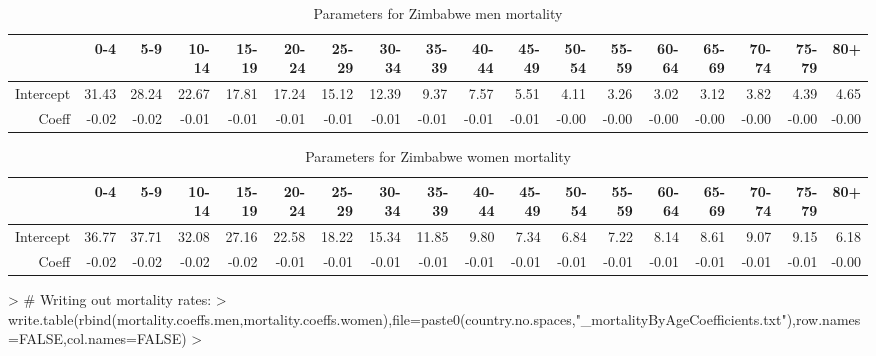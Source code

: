 \documentclass{article}
\begin{document}
\begin{landscape}
\begin{table}[ht]
\centering
\begin{tabular}{rrrrrrrrrrrrrrrrrr}
  \hline
 & 0-4 & 5-9 & 10-14 & 15-19 & 20-24 & 25-29 & 30-34 & 35-39 & 40-44 & 45-49 & 50-54 & 55-59 & 60-64 & 65-69 & 70-74 & 75-79 & 80+ \\ 
  \hline
Intercept & 31.43 & 28.24 & 22.67 & 17.81 & 17.24 & 15.12 & 12.39 & 9.37 & 7.57 & 5.51 & 4.11 & 3.26 & 3.02 & 3.12 & 3.82 & 4.39 & 4.65 \\ 
  Coeff & -0.02 & -0.02 & -0.01 & -0.01 & -0.01 & -0.01 & -0.01 & -0.01 & -0.01 & -0.01 & -0.00 & -0.00 & -0.00 & -0.00 & -0.00 & -0.00 & -0.00 \\ 
   \hline
\end{tabular}
\caption{Parameters for Zimbabwe men mortality} 
\end{table}%
\begin{table}[ht]
\centering
\begin{tabular}{rrrrrrrrrrrrrrrrrr}
  \hline
 & 0-4 & 5-9 & 10-14 & 15-19 & 20-24 & 25-29 & 30-34 & 35-39 & 40-44 & 45-49 & 50-54 & 55-59 & 60-64 & 65-69 & 70-74 & 75-79 & 80+ \\ 
  \hline
Intercept & 36.77 & 37.71 & 32.08 & 27.16 & 22.58 & 18.22 & 15.34 & 11.85 & 9.80 & 7.34 & 6.84 & 7.22 & 8.14 & 8.61 & 9.07 & 9.15 & 6.18 \\ 
  Coeff & -0.02 & -0.02 & -0.02 & -0.02 & -0.01 & -0.01 & -0.01 & -0.01 & -0.01 & -0.01 & -0.01 & -0.01 & -0.01 & -0.01 & -0.01 & -0.01 & -0.00 \\ 
   \hline
\end{tabular}
\caption{Parameters for Zimbabwe women mortality} 
\end{table}

\end{landscape}


%
\begin{Schunk}
\begin{Sinput}
> # Writing out mortality rates:
> write.table(rbind(mortality.coeffs.men,mortality.coeffs.women),file=paste0(country.no.spaces,"_mortalityByAgeCoefficients.txt"),row.names=FALSE,col.names=FALSE)
> 
\end{Sinput}
\end{Schunk}
\end{document}
